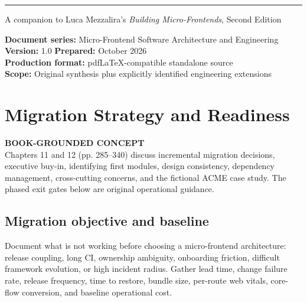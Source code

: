 \documentclass[11pt,letterpaper,oneside]{report}
\newcommand{\based}[1]{\begin{sourcebox}\textbf{BOOK-GROUNDED CONCEPT}\\#1\end{sourcebox}}
\begin{document}
\hypersetup{pageanchor=false}%
\begin{titlepage}\thispagestyle{empty}
\vspace{27pt}\noindent\color{blue}\rule{0.75\textwidth}{1.4pt}
\vspace{23pt}\par{\large\sffamily A companion to Luca Mezzalira's \emph{Building Micro-Frontends}, Second Edition}\par
\vfill\noindent\textbf{Document series:} Micro-Frontend Software Architecture and Engineering\\
\textbf{Version:} 1.0 \quad \textbf{Prepared:} October 2026\\
\textbf{Production format:} pdfLaTeX-compatible standalone source\\
\textbf{Scope:} Original synthesis plus explicitly identified engineering extensions
\end{titlepage}\hypersetup{pageanchor=true}
\tableofcontents\clearpage{}

\chapter{Migration Strategy and Readiness}
\based{Chapters 11 and 12 (pp. 285--340) discuss incremental migration decisions, executive buy-in, identifying first modules, design consistency, dependency management, cross-cutting concerns, and the fictional ACME case study. The phased exit gates below are original operational guidance.}
\section{Migration objective and baseline}
Document what is not working before choosing a micro-frontend architecture: release coupling, long CI, ownership ambiguity, onboarding friction, difficult framework evolution, or high incident radius. Gather lead time, change failure rate, release frequency, time to restore, bundle size, per-route web vitals, core-flow conversion, and baseline operational cost.
\end{document}
